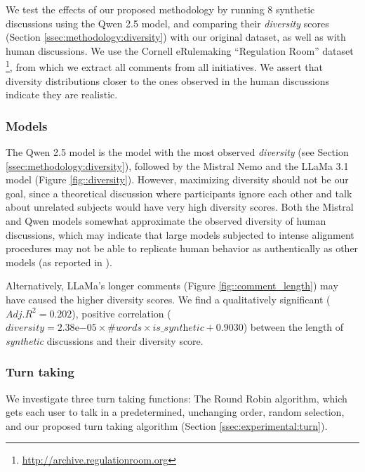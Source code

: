 We test the effects of our proposed methodology by running $8$ synthetic discussions using the Qwen 2.5 model, and comparing their \textit{diversity} scores (Section \ref{ssec:methodology:diversity}) with our original dataset, as well as with human discussions. We use the Cornell eRulemaking “Regulation Room” dataset \footnote{\url{http://archive.regulationroom.org}}, from which we extract all comments from all initiatives. We assert that diversity distributions closer to the ones observed in the human discussions indicate they are realistic.



\subsubsection{Models}

The Qwen 2.5 model is the model with the most observed \textit{diversity} (see Section \ref{ssec:methodology:diversity}), followed by the Mistral Nemo and the LLaMa 3.1 model (Figure \ref{fig::diversity}). However, maximizing diversity should not be our goal, since a theoretical discussion where participants ignore each other and talk about unrelated subjects would have very high diversity scores. Both the Mistral and Qwen models somewhat approximate the observed diversity of human discussions, which may indicate that large models subjected to intense alignment procedures may not be able to replicate human behavior as authentically as other models (as reported in \citet{Park2023GenerativeAI}). 

Alternatively, LLaMa's longer comments (Figure \ref{fig::comment_length}) may have caused the higher diversity scores. We find a qualitatively significant  ($Adj. R^2=0.202$), positive correlation ($\textit{diversity} = 2.38\mathrm{e}{-05} \times \textit{\#words} \times \textit{is\_synthetic} + 0.9030$) between the length of \textit{synthetic} discussions and their diversity score.


\subsubsection{Turn taking}

We investigate three turn taking functions: The Round Robin algorithm, which gets each user to talk in a predetermined, unchanging order, random selection, and our proposed turn taking algorithm (Section \ref{ssec:experimental:turn}).

